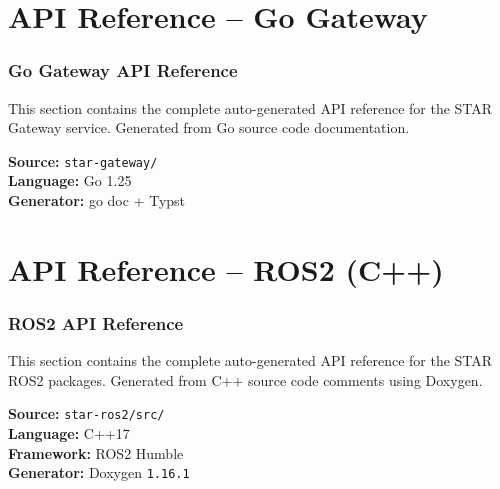 \documentclass[11pt,letterpaper]{article}
\begin{document}
\newpage


\part{API Reference -- Go Gateway}

\newpage
\section*{Go Gateway API Reference}

This section contains the complete auto-generated API reference for the
STAR Gateway service. Generated from Go source code documentation.

\vspace{1em}
\noindent\textbf{Source:} \texttt{star-gateway/}\\
\textbf{Language:} Go 1.25\\
\textbf{Generator:} go doc + Typst

\newpage


\part{API Reference -- ROS2 (C++)}

\newpage
\section*{ROS2 API Reference}

This section contains the complete auto-generated API reference for the
STAR ROS2 packages. Generated from C++ source code comments using Doxygen.

\vspace{1em}
\noindent\textbf{Source:} \texttt{star-ros2/src/}\\
\textbf{Language:} C++17\\
\textbf{Framework:} ROS2 Humble\\
\textbf{Generator:} Doxygen \texttt{1.16.1}

\newpage

\end{document}
